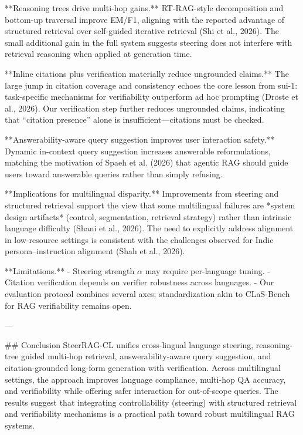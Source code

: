 **Reasoning trees drive multi-hop gains.** RT-RAG-style decomposition and bottom-up traversal improve EM/F1, aligning with the reported advantage of structured retrieval over self-guided iterative retrieval (Shi et al., 2026). The small additional gain in the full system suggests steering does not interfere with retrieval reasoning when applied at generation time.

**Inline citations plus verification materially reduce ungrounded claims.** The large jump in citation coverage and consistency echoes the core lesson from sui-1: task-specific mechanisms for verifiability outperform ad hoc prompting (Droste et al., 2026). Our verification step further reduces ungrounded claims, indicating that “citation presence” alone is insufficient—citations must be checked.

**Answerability-aware query suggestion improves user interaction safety.** Dynamic in-context query suggestion increases answerable reformulations, matching the motivation of Spaeh et al. (2026) that agentic RAG should guide users toward answerable queries rather than simply refusing.

**Implications for multilingual disparity.** Improvements from steering and structured retrieval support the view that some multilingual failures are *system design artifacts* (control, segmentation, retrieval strategy) rather than intrinsic language difficulty (Shani et al., 2026). The need to explicitly address alignment in low-resource settings is consistent with the challenges observed for Indic persona–instruction alignment (Shah et al., 2026).

**Limitations.**
- Steering strength \(\alpha\) may require per-language tuning.
- Citation verification depends on verifier robustness across languages.
- Our evaluation protocol combines several axes; standardization akin to CLaS-Bench for RAG verifiability remains open.

---

## Conclusion
SteerRAG-CL unifies cross-lingual language steering, reasoning-tree guided multi-hop retrieval, answerability-aware query suggestion, and citation-grounded long-form generation with verification. Across multilingual settings, the approach improves language compliance, multi-hop QA accuracy, and verifiability while offering safer interaction for out-of-scope queries. The results suggest that integrating controllability (steering) with structured retrieval and verifiability mechanisms is a practical path toward robust multilingual RAG systems.

